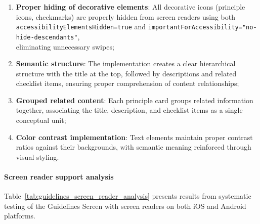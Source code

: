 \begin{enumerate}
    \item \textbf{Proper hiding of decorative elements}: All decorative icons (principle icons, checkmarks) are properly hidden from screen readers using both \texttt{accessibilityElementsHidden=true} and \texttt{importantForAccessibility="no-hide-descendants"}, \\ eliminating unnecessary swipes;
    
    \item \textbf{Semantic structure}: The implementation creates a clear hierarchical structure with the title at the top, followed by descriptions and related checklist items, ensuring proper comprehension of content relationships;
    
    \item \textbf{Grouped related content}: Each principle card groups related information together, associating the title, description, and checklist items as a single conceptual unit;
    
    \item \textbf{Color contrast implementation}: Text elements maintain proper contrast ratios against their backgrounds, with semantic meaning reinforced through visual styling.
\end{enumerate}

\paragraph{Screen reader support analysis}

Table~\ref{tab:guidelines_screen_reader_analysis} presents results from systematic testing of the Guidelines Screen with screen readers on both iOS and Android platforms.


